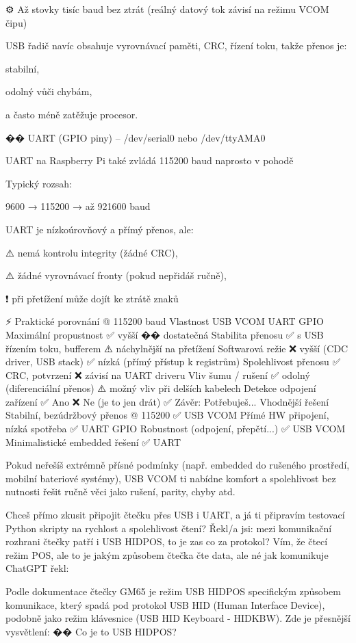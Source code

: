         ⚙️ Až stovky tisíc baud bez ztrát (reálný datový tok závisí na režimu VCOM čipu)

    USB řadič navíc obsahuje vyrovnávací paměti, CRC, řízení toku, takže přenos je:

        stabilní,

        odolný vůči chybám,

        a často méně zatěžuje procesor.

�� UART (GPIO piny) – /dev/serial0 nebo /dev/ttyAMA0

    UART na Raspberry Pi také zvládá 115200 baud naprosto v pohodě

    Typický rozsah:

        9600 → 115200 → až 921600 baud

    UART je nízkoúrovňový a přímý přenos, ale:

        ⚠️ nemá kontrolu integrity (žádné CRC),

        ⚠️ žádné vyrovnávací fronty (pokud nepřidáš ručně),

        ❗ při přetížení může dojít ke ztrátě znaků

⚡ Praktické porovnání @ 115200 baud
Vlastnost	USB VCOM	UART GPIO
Maximální propustnost	✅ vyšší	�� dostatečná
Stabilita přenosu	✅ s USB řízením toku, bufferem	⚠️ náchylnější na přetížení
Softwarová režie	❌ vyšší (CDC driver, USB stack)	✅ nízká (přímý přístup k registrům)
Spolehlivost přenosu	✅ CRC, potvrzení	❌ závisí na UART driveru
Vliv šumu / rušení	✅ odolný (diferenciální přenos)	⚠️ možný vliv při delších kabelech
Detekce odpojení zařízení	✅ Ano	❌ Ne (je to jen drát)
✅ Závěr:
Potřebuješ...	Vhodnější řešení
Stabilní, bezúdržbový přenos @ 115200	✅ USB VCOM
Přímé HW připojení, nízká spotřeba	✅ UART GPIO
Robustnost (odpojení, přepětí...)	✅ USB VCOM
Minimalistické embedded řešení	✅ UART

Pokud neřešíš extrémně přísné podmínky (např. embedded do rušeného prostředí, mobilní bateriové systémy), USB VCOM ti nabídne komfort a spolehlivost bez nutnosti řešit ručně věci jako rušení, parity, chyby atd.

Chceš přímo zkusit připojit čtečku přes USB i UART, a já ti připravím testovací Python skripty na rychlost a spolehlivost čtení?
Řekl/a jsi:
mezi komunikační rozhrani čtečky patří i USB HIDPOS, to je zas co za protokol? Vím, že čtecí režim POS, ale to je jakým způsobem čtečka čte data, ale né jak komunikuje
ChatGPT řekl:

Podle dokumentace čtečky GM65 je režim USB HIDPOS specifickým způsobem komunikace, který spadá pod protokol USB HID (Human Interface Device), podobně jako režim klávesnice (USB HID Keyboard - HIDKBW). Zde je přesnější vysvětlení:
�� Co je to USB HIDPOS?

